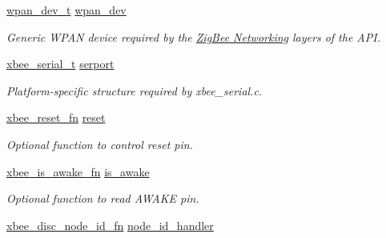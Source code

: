 \begin{DoxyCompactItemize}
\item 
\hypertarget{group__xbee__device_ga8547395da056b57ba7c6b26c0c0f6ccf}{\hyperlink{structwpan__dev__t}{wpan\-\_\-dev\-\_\-t} \hyperlink{group__xbee__device_ga8547395da056b57ba7c6b26c0c0f6ccf}{wpan\-\_\-dev}}\label{group__xbee__device_ga8547395da056b57ba7c6b26c0c0f6ccf}

\begin{DoxyCompactList}\small\item\em Generic W\-P\-A\-N device required by the \hyperlink{group__zigbee}{Zig\-Bee Networking} layers of the A\-P\-I. \end{DoxyCompactList}\item 
\hypertarget{group__xbee__device_ga3145a7888ffabfc3f10e8e85ced0c686}{\hyperlink{structxbee__serial__t}{xbee\-\_\-serial\-\_\-t} \hyperlink{group__xbee__device_ga3145a7888ffabfc3f10e8e85ced0c686}{serport}}\label{group__xbee__device_ga3145a7888ffabfc3f10e8e85ced0c686}

\begin{DoxyCompactList}\small\item\em Platform-\/specific structure required by xbee\-\_\-serial.\-c. \end{DoxyCompactList}\item 
\hypertarget{group__xbee__device_ga1f3cf44cb21be8f101d33062a9d2cf97}{\hyperlink{group__xbee__device_ga7f2f41997c6215582cf3491c984b31ea}{xbee\-\_\-reset\-\_\-fn} \hyperlink{group__xbee__device_ga1f3cf44cb21be8f101d33062a9d2cf97}{reset}}\label{group__xbee__device_ga1f3cf44cb21be8f101d33062a9d2cf97}

\begin{DoxyCompactList}\small\item\em Optional function to control reset pin. \end{DoxyCompactList}\item 
\hypertarget{group__xbee__device_gaf17bb63b8639d0278a2d0ad259865930}{\hyperlink{group__xbee__device_gace56b1c8dd7dc5a23f6fa01878d45b09}{xbee\-\_\-is\-\_\-awake\-\_\-fn} \hyperlink{group__xbee__device_gaf17bb63b8639d0278a2d0ad259865930}{is\-\_\-awake}}\label{group__xbee__device_gaf17bb63b8639d0278a2d0ad259865930}

\begin{DoxyCompactList}\small\item\em Optional function to read A\-W\-A\-K\-E pin. \end{DoxyCompactList}\item 
\hypertarget{group__xbee__device_ga4952189ed8b46b133b5298b4fce75ab8}{\hyperlink{group__xbee__device_ga55de36532265a72bffa969d5353800d7}{xbee\-\_\-disc\-\_\-node\-\_\-id\-\_\-fn} \hyperlink{group__xbee__device_ga4952189ed8b46b133b5298b4fce75ab8}{node\-\_\-id\-\_\-handler}}\label{group__xbee__device_ga4952189ed8b46b133b5298b4fce75ab8}


\end{DoxyCompactItemize}
